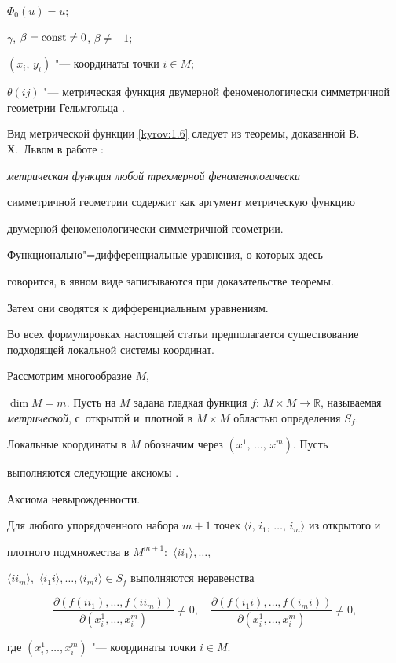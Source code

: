 $\varPhi_{0}(u) = u $; 

$\gamma$, $\beta = \rm{const}\ne 0$, $\beta \ne \pm 1$; 

$(x_i,\,y_i)$ "--- координаты точки $i\in M$;

$\theta(ij)$ "--- метрическая функция двумерной феноменологически симметричной геометрии Гельмгольца \cite{kyrov:bib1}. 

Вид метрической функции \eqref{kyrov:1.6} следует из теоремы, доказанной В.\,Х.~Львом в работе \cite{kyrov:bib2}:

{\it метрическая функция любой трехмерной феноменологически

симметричной геометрии содержит как аргумент метрическую функцию

двумерной феноменологически симметричной геометрии.}



Функционально"=дифференциальные уравнения, о которых здесь

говорится, в явном виде записываются при доказательстве теоремы.

Затем они сводятся к дифференциальным уравнениям. 

Во всех формулировках настоящей статьи предполагается существование подходящей локальной системы координат.



\smallskip



 Рассмотрим многообразие $M$,

$\dim M = m$. Пусть на $M$ задана гладкая функция $f$: $M\times

M\rightarrow \mathbb R$, называемая {\it метрической}, с~открытой и~плотной в $M\times M$ областью определения $S_f$. 

Локальные координаты в $M$ обозначим через $(x^1,\,\ldots,\,x^m)$. Пусть

выполняются следующие аксиомы \cite{kyrov:bib3}.



{\small \sc Аксиома невырожденности.} {\it 

Для любого упорядоченного набора $m+1$ точек $\langle i,\,i_1,\,\ldots,\,i_m\rangle$ из открытого и

плотного подмножества в $M^{m+1}:$ \linebreak $\langle ii_1\rangle,\ldots,$

$\langle ii_m\rangle,$ $\langle i_1i\rangle,\ldots,\langle

i_mi\rangle\in S_f$ выполняются неравенства

$$

\frac{\partial(f(ii_1),\ldots,f(ii_m))}{\partial(x^1_i,\ldots,x^m_i)}\ne0,\quad

\frac{\partial(f(i_1i),\ldots,f(i_mi))}{\partial(x^1_i,\ldots,x^m_i)}\ne0,

$$

где $(x^1_i,\ldots,x^m_i)$ "--- координаты точки $i\in M.$

}



